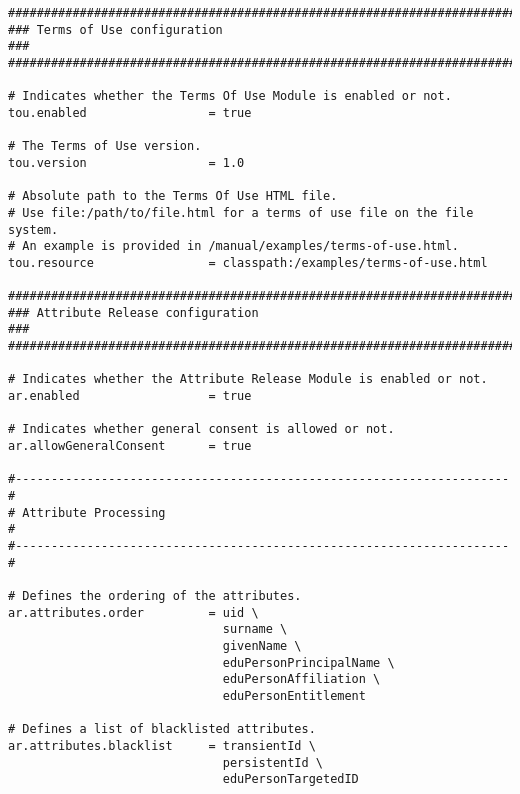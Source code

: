 \begin{lstlisting}
#######################################################################
### Terms of Use configuration                                      ###
#######################################################################

# Indicates whether the Terms Of Use Module is enabled or not.
tou.enabled                 = true

# The Terms of Use version.
tou.version                 = 1.0

# Absolute path to the Terms Of Use HTML file.
# Use file:/path/to/file.html for a terms of use file on the file system.
# An example is provided in /manual/examples/terms-of-use.html.
tou.resource                = classpath:/examples/terms-of-use.html

#######################################################################
### Attribute Release configuration                                 ###
#######################################################################

# Indicates whether the Attribute Release Module is enabled or not.
ar.enabled                  = true

# Indicates whether general consent is allowed or not.
ar.allowGeneralConsent      = true

#---------------------------------------------------------------------#
# Attribute Processing                                                #
#---------------------------------------------------------------------#

# Defines the ordering of the attributes.
ar.attributes.order         = uid \
                              surname \
                              givenName \
                              eduPersonPrincipalName \
                              eduPersonAffiliation \
                              eduPersonEntitlement

# Defines a list of blacklisted attributes.              
ar.attributes.blacklist     = transientId \
                              persistentId \
                              eduPersonTargetedID
                          
\end{lstlisting}

